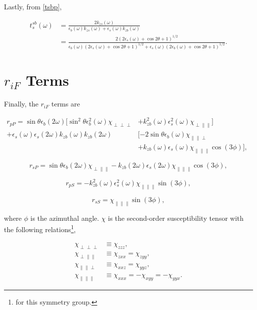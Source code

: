 \documentclass[letterpaper]{article}
\begin{document}
Lastly, from \eqref{tsbp},

\begin{align*}
t^{sb}_{s}(\omega) &= \frac{2k_{zs}(\omega)}{\epsilon_{b}(\omega)k_{zs}(\omega) + \epsilon_{s}(\omega)k_{zb}(\omega)} \nonumber \\
&=\frac{2(2\epsilon_{s}(\omega) + \cos 2\theta + 1)^{1/2}}{\epsilon_{b}(\omega)(2\epsilon_{s}(\omega) + \cos 2\theta + 1)^{1/2} + \epsilon_{s}(\omega)(2\epsilon_{b}(\omega) + \cos 2\theta + 1)^{1/2}}.
\end{align*}

\section{$r_{iF}$ Terms}

Finally, the $r_{iF}$ terms are

\begin{align*}
r_{pP} = \sin\theta\epsilon_{b}(2\omega)[\sin^{2}\theta\epsilon^{2}_{b}(\omega)\chi_{\perp\perp\perp} &+ k^{2}_{zb}(\omega)\epsilon^{2}_{s}(\omega)\chi_{\perp\parallel\parallel}] \nonumber \\
+ \epsilon_{s}(\omega)\epsilon_{s}(2\omega)k_{zb}(\omega)k_{zb}(2\omega)&[-2\sin\theta\epsilon_{b}(\omega)\chi_{\parallel\parallel\perp}&\\
&+ k_{zb}(\omega)\epsilon_{s}(\omega)\chi_{\parallel\parallel\parallel}\cos(3\phi)], \nonumber
\end{align*}

\begin{equation*}
r_{sP} = \sin\theta\epsilon_{b}(2\omega)\chi_{\perp\parallel\parallel} - k_{zb}(2\omega)\epsilon_{s}(2\omega)\chi_{\parallel\parallel\parallel}\cos(3\phi),
\end{equation*}

\begin{equation*}
r_{pS} = -k^{2}_{zb}(\omega)\epsilon^{2}_{s}(\omega)\chi_{\parallel\parallel\parallel}\sin(3\phi),
\end{equation*}

\begin{equation*}
r_{sS} = \chi_{\parallel\parallel\parallel}\sin(3\phi),
\end{equation*}

where $\phi$ is the azimuthal angle. $\chi$ is the second-order susceptibility tensor with the following relations\footnote{for this symmetry group.},

\begin{align}
\chi_{\perp\perp\perp}&\equiv\chi_{zzz}, \nonumber \\
\chi_{\perp\parallel\parallel}&\equiv\chi_{zxx}=\chi_{zyy}, \nonumber \\
\chi_{\parallel\parallel\perp}&\equiv\chi_{xxz}=\chi_{yyz}, \nonumber \\
\chi_{\parallel\parallel\parallel}&\equiv\chi_{xxx}=-\chi_{xyy}=-\chi_{yyx}.
\end{align}
\end{document}
